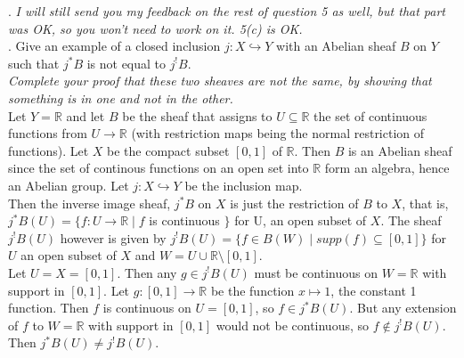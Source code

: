 . \textit{I will still send you my feedback on the rest of question 5 as well, but that part was OK, so you won't need to work on it. 5(c) is OK.}\\
. Give an example of a closed inclusion $j: X \hookrightarrow Y$ with an Abelian sheaf $B$ on $Y$ such that $j^*B$ is not equal to $j^!B$.\\

\textit{Complete your proof that these two sheaves are not the same, by showing that something is in one and not in the other.}\\

Let $Y=\mathbb{R}$ and let $B$ be the sheaf that assigns to $U \subseteq \mathbb{R}$ the set of continuous functions from $U \rightarrow \mathbb{R}$ (with restriction maps being the normal restriction of functions). Let $X$ be the compact subset $[0,1]$ of $\mathbb{R}$. Then $B$ is an Abelian sheaf since the set of continous functions on an open set into $\mathbb{R}$ form an algebra, hence an Abelian group. Let $j:X \hookrightarrow Y$ be the inclusion map. \\

Then the inverse image sheaf, $j^*B$ on $X$ is just the restriction of $B$ to $X$, that is, $j^*B(U) = \{f:U \rightarrow \mathbb{R} \mid f$ is continuous $\}$ for U, an open subset of $X$. The sheaf $j^!B(U)$ however is given by $j^!B(U) =\{f \in B(W) \mid supp(f) \subseteq [0,1] \}$ for $U$ an open subset of $X$ and $W=U \cup \mathbb{R} \setminus [0,1]$.\\

Let $U = X =[0,1]$. Then any $g \in j^!B(U)$ must be continuous on $W = \mathbb{R}$ with support in $[0,1]$. Let $g: [0,1] \rightarrow \mathbb{R}$ be the function $x \mapsto 1$, the constant 1 function. Then $f$ is continuous on $U = [0,1]$, so $f \in j^*B(U)$. But any extension of $f$ to $W = \mathbb{R}$ with support in $[0,1]$ would not be continuous, so $f \notin j^!B(U)$. Then $ j^*B(U) \neq  j^!B(U)$.